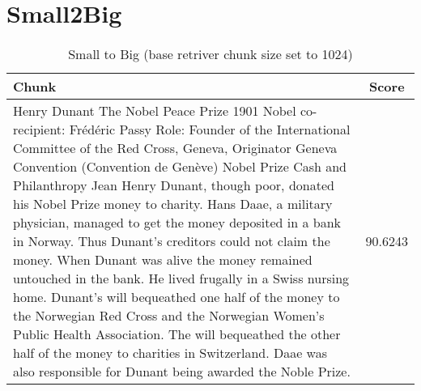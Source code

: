 \section{Small2Big}\label{sec:chunking:small2big}
\begin{table}[h!]
    \footnotesize
    \begin{xltabular}{\linewidth}{X|c}
        \toprule
        \textbf{Chunk}                                                                                                                                                                                                                                                                                                                                                                                                                                                                                                                                                                                                                                                                                                                                                                                                                                                                                                                                                                                                                                                                                                                       & \textbf{Score} \\
        \midrule
        Henry Dunant The Nobel Peace Prize 1901 Nobel co-recipient: Frédéric Passy Role: Founder of the International Committee of the Red Cross, Geneva, Originator Geneva Convention (Convention de Genève) Nobel Prize Cash and Philanthropy Jean Henry Dunant, though poor, donated his Nobel Prize money to charity. Hans Daae, a military physician, managed to get the money deposited in a bank in Norway. Thus Dunant’s creditors could not claim the money. When Dunant was alive the money remained untouched in the bank. He lived frugally in a Swiss nursing home.  Dunant’s will bequeathed one half of the money to the Norwegian Red Cross and the Norwegian Women’s Public Health Association. The will bequeathed the other half of the money to charities in Switzerland.  Daae was also responsible for Dunant being awarded the Noble Prize. & 90.6243\\
        \bottomrule
    \end{xltabular}
    \caption{Small to Big (base retriver chunk size set to 1024)}
    \label{tab:table-small2big}
\end{table}


